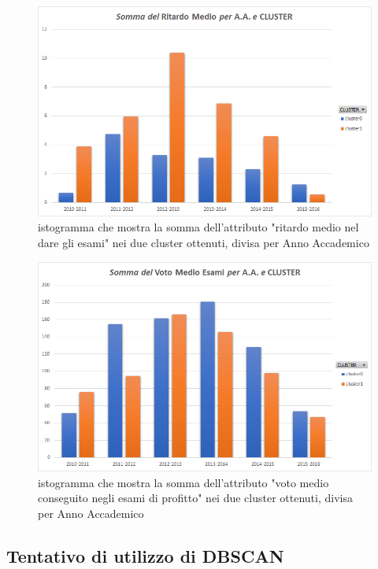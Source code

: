         \begin{figure}
            \centering
            \caption{istogramma che mostra la somma dell'attributo "ritardo medio nel dare gli esami" nei due cluster ottenuti, divisa per Anno Accademico}
            \label{ritardo}
            \includegraphics[scale=0.5]{../cluster/min_kmeans_2cl_ritardo.png}
        \end{figure}

        \begin{figure}
            \centering
            \caption{istogramma che mostra la somma dell'attributo "voto medio conseguito negli esami di profitto" nei due cluster ottenuti, divisa per Anno Accademico}
            \label{voto}
            \includegraphics[scale=0.5]{../cluster/min_kmeans_2cl_voto.png}
        \end{figure}

    \subsection{Tentativo di utilizzo di DBSCAN}

